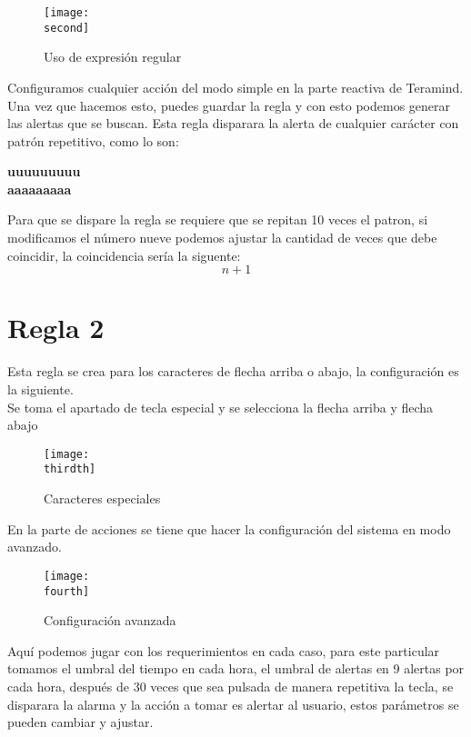 \documentclass[a4paper]{article}
\newcommand{\second}{img/captura2.png}
\newcommand{\thirdth}{img/captura3.png}
\newcommand{\fourth}{img/captura4.png}
\begin{document}
    \begin{figure}[H] 
        \centering 
        \texttt{[image: \\second]} 
        \caption{Uso de expresión regular} 
    \end{figure}

    Configuramos cualquier acción del modo simple en la parte reactiva de Teramind.
    Una vez que hacemos esto, puedes guardar la regla y con esto podemos generar las alertas que se buscan.
    Esta regla disparara la alerta de cualquier carácter con patrón repetitivo, como lo son:

    \begin{center}
        \textbf{uuuuuuuuu} \\
        \textbf{aaaaaaaaa}
    \end{center}
        
    Para que se dispare la regla se requiere que se repitan 10 veces el patron, si modificamos el número nueve podemos ajustar la cantidad de veces que debe coincidir, la coincidencia sería la siguente:
    \begin{displaymath}
        n+1
    \end{displaymath}
    
    \section{Regla 2}
    Esta regla se crea para los caracteres de flecha arriba o abajo, la configuración es la siguiente.\\
    Se toma el apartado de tecla especial y se selecciona la flecha arriba y flecha abajo
    \begin{figure}[H] 
        \centering 
        \texttt{[image: \\thirdth]} 
        \caption{Caracteres especiales}
    \end{figure}

    En la parte de acciones se tiene que hacer la configuración del sistema en modo avanzado.
    \begin{figure}[H] 
        \centering 
        \texttt{[image: \\fourth]} 
        \caption{Configuración avanzada}
    \end{figure}

    Aquí podemos jugar con los requerimientos en cada caso, para este particular tomamos el umbral del tiempo en cada hora, el umbral de alertas en 9 alertas por cada hora, después de 30 veces que sea pulsada de manera repetitiva la tecla, se disparara la alarma y la acción a tomar es alertar al usuario, estos parámetros se pueden cambiar y ajustar.
\end{document}
